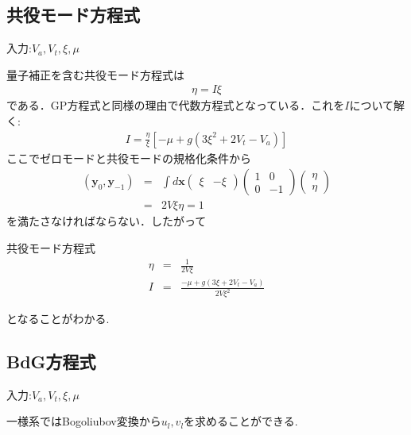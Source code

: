 \documentclass[10.5pt,a4paper]{jreport}
\begin{document}
\subsection{共役モード方程式}
入力:$V_a, V_t, \xi, \mu$

量子補正を含む共役モード方程式は
\begin{eqnarray}
  [-\mu + g(3\xi^2 + 2V_t - V_a)]\eta = I\xi 
\end{eqnarray}
である．GP方程式と同様の理由で代数方程式となっている．これを$I$について解く:
\begin{eqnarray}
  I = \frac{\eta}{\xi}[-\mu + g(3\xi^2 + 2V_t - V_a)]
\end{eqnarray}
ここでゼロモードと共役モードの規格化条件から
\begin{eqnarray}
  \nonumber  (\bm{y}_0, \bm{y}_{-1}) &=& \int d\bm{x}
  \begin{pmatrix}
    \xi & -\xi
  \end{pmatrix}
  \begin{pmatrix}
    1 & 0\\
    0 & -1
  \end{pmatrix}
  \begin{pmatrix}
    \eta\\
    \eta
  \end{pmatrix}\\
  &=& 2V\xi\eta = 1
\end{eqnarray}
を満たさなければならない．したがって
\begin{itembox}[c]{共役モード方程式}
\begin{eqnarray}
  \eta &=& \frac{1}{2V\xi}\\
  I &=& \frac{-\mu + g(3\xi + 2V_t - V_a)}{2V\xi^2}
\end{eqnarray}
\end{itembox}
となることがわかる.

\subsection{BdG方程式}
入力:$V_a, V_t, \xi, \mu$

一様系ではBogoliubov変換から$u_l,v_l$を求めることができる.
\end{document}
